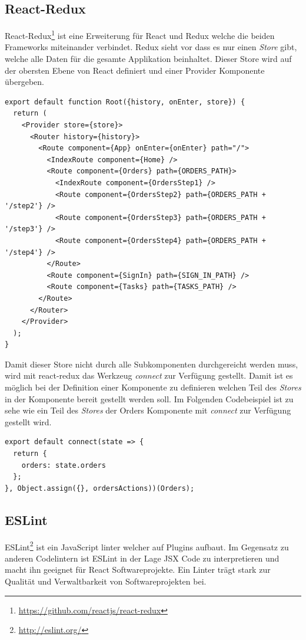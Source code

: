 \subsection{React-Redux}
React-Redux\footnote{\url{https://github.com/reactjs/react-redux}} ist eine Erweiterung für React und Redux welche die beiden Frameworks miteinander verbindet. Redux sieht vor dass es nur einen \textit{Store} gibt, welche alle Daten für die gesamte Applikation beinhaltet. Dieser Store wird auf der obersten Ebene von React definiert und einer Provider Komponente übergeben.

\begin{lstlisting}[caption=Root Komponente]
export default function Root({history, onEnter, store}) {
  return (
    <Provider store={store}>
      <Router history={history}>
        <Route component={App} onEnter={onEnter} path="/">
          <IndexRoute component={Home} />
          <Route component={Orders} path={ORDERS_PATH}>
            <IndexRoute component={OrdersStep1} />
            <Route component={OrdersStep2} path={ORDERS_PATH + '/step2'} />
            <Route component={OrdersStep3} path={ORDERS_PATH + '/step3'} />
            <Route component={OrdersStep4} path={ORDERS_PATH + '/step4'} />
          </Route>
          <Route component={SignIn} path={SIGN_IN_PATH} />
          <Route component={Tasks} path={TASKS_PATH} />
        </Route>
      </Router>
    </Provider>
  );
}
\end{lstlisting}

Damit dieser Store nicht durch alle Subkomponenten durchgereicht werden muss, wird mit react-redux das Werkzeug \textit{connect} zur Verfügung gestellt. Damit ist es möglich bei der Definition einer Komponente zu definieren welchen Teil des \textit{Stores} in der Komponente bereit gestellt werden soll. Im Folgenden Codebeispiel ist zu sehe wie ein Teil des \textit{Stores} der Orders Komponente mit \textit{connect} zur Verfügung gestellt wird.
\begin{lstlisting}[caption=connect im Einsatz]
export default connect(state => {
  return {
    orders: state.orders
  };
}, Object.assign({}, ordersActions))(Orders);
\end{lstlisting}

\subsection{ESLint}
ESLint\footnote{\url{http://eslint.org/}} ist ein JavaScript linter welcher auf Plugins aufbaut. Im Gegensatz zu anderen Codelintern ist ESLint in der Lage JSX Code zu interpretieren und macht ihn geeignet für React Softwareprojekte. Ein Linter trägt stark zur Qualität und Verwaltbarkeit von Softwareprojekten bei.


